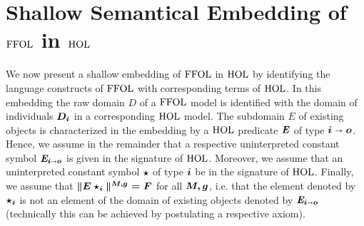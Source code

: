 \section{Shallow Semantical Embedding of $\text{\textrm{FFOL}}$ in $\text{\textrm{HOL}}$}
We now present a shallow embedding of $\text{\textrm{FFOL}}$ in $\text{\textrm{HOL}}$ by identifying
the language constructs of $\text{\textrm{FFOL}}$ with corresponding terms of $\text{\textrm{HOL}}$.
In this embedding the raw domain $D$ of a $\text{\textrm{FFOL}}$ model is
identified with the domain of individuals $\boldsymbol{D_i}$ in a corresponding $\text{\textrm{HOL}}$ model.  The subdomain $E$ of
existing objects is characterized in the embedding by a $\text{\textrm{HOL}}$
predicate $\boldsymbol{\mathit{E}}$ of type $\boldsymbol{ i\shortrightarrow o}$. Hence, we assume in the
remainder that a respective uninterpreted constant symbol
$\boldsymbol{\mathit{E}_{i\shortrightarrow o}}$
is given in the signature of $\text{\textrm{HOL}}$. Moreover, we assume that an
uninterpreted constant symbol $\boldsymbol{\star}$ of type $\boldsymbol{i}$ be in the
signature of $\text{\textrm{HOL}}$. Finally, we assume that $\boldsymbol{\|E \star_i\|^{M,g}=F}$ for
all $\boldsymbol{M,g}$, i.e. that the element denoted by $\boldsymbol{\star_i}$ is not
an element of the domain of existing objects denoted by
$\boldsymbol{\mathit{E}_{i\shortrightarrow o}}$ (technically this can be achieved by postulating
a respective axiom).

